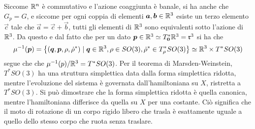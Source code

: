 Siccome $\mathbb{R}^{n}$ è commutativo e l'azione coaggiunta è banale, si ha anche che $G_p = G$, e siccome per ogni coppia di elementi $\boldsymbol{a}, \boldsymbol{b} \in \mathbb{R}^3$ esiste un terzo elemento $\vec{c}$ tale che $\vec{a} = \vec{c} + \vec{b}$, tutti gli elementi di $\mathbb{R}^3$ sono equivalenti sotto l'azione di $\mathbb{R}^3$. Da questo e dal fatto che per un dato $\boldsymbol{p} \in \mathbb{R}^3 \simeq T^*_{\boldsymbol{0}} \mathbb{R}^3 = \mathfrak{r}^3$ si ha che
\begin{equation*}
\mu^{-1}(\boldsymbol{p}) = \big\lbrace(\boldsymbol{q},\boldsymbol{p}, \rho, \dot{\rho}^*) \mid \boldsymbol{q}\in \mathbb{R}^3, \rho \in SO(3), \dot{\rho}^* \in T^*_{\rho} SO(3)\big\rbrace \simeq \mathbb{R}^3 \times T^*SO(3)
\end{equation*} 
segue che che $\mu^{-1}(p)/\mathbb{R}^3 = T^*SO(3)$. Per il teorema di Marsden-Weinstein, $T^* SO(3)$ ha una struttura simplettica data dalla forma simplettica ridotta, mentre l'evoluzione del sistema è governata dall'hamiltoniana su $X$, ristretta a $T^* SO(3)$. Si può dimostrare che la forma simplettica ridotta è quella canonica, mentre l'hamiltoniana differisce da quella su $X$ per una costante. Ciò significa che il moto di rotazione di un corpo rigido libero che trasla è esattamente uguale a quello dello stesso corpo che ruota senza traslare.

